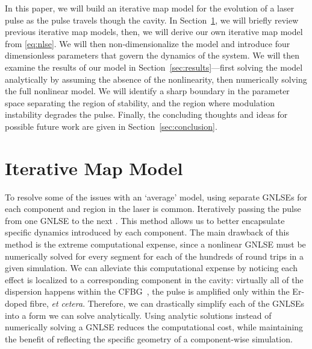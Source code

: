 \documentclass[9pt,twocolumn,twoside]{osajnl}
\begin{document}
In this paper, we will build an iterative map model for the evolution of a laser pulse as the pulse travels though the cavity. In Section~\ref{sec:model}, we will briefly review previous iterative map models, then, we will derive our own iterative map model from \eqref{eq:nlse}. We will then non-dimensionalize the model and introduce four dimensionless parameters that govern the dynamics of the system. We will then examine the results of our model in Section~\ref{sec:results}---first solving the model analytically by assuming the absence of the nonlinearity, then numerically solving the full nonlinear model. We will identify a sharp boundary in the parameter space separating the region of stability, and the region where modulation instability degrades the pulse. Finally, the concluding thoughts and ideas for possible future work are given in Section~\ref{sec:conclusion}.

\section{Iterative Map Model}
\label{sec:model}
To resolve some of the issues with an `average' model, using separate GNLSEs for each component and region in the laser is common. Iteratively passing the pulse from one GNLSE to the next \cite{lapre2019, meng2020, oktem2010, woodward2018}. This method allows us to better encapsulate specific dynamics introduced by each component. The main drawback of this method is the extreme computational expense, since a nonlinear GNLSE must be numerically solved for every segment for each of the hundreds of round trips in a given simulation. We can alleviate this computational expense by noticing each effect is localized to a corresponding component in the cavity: virtually all of the dispersion happens within the CFBG~\cite{agrawal2002}, the pulse is amplified only within the Er-doped fibre, \emph{et cetera}. Therefore, we can drastically simplify each of the GNLSEs into a form we can solve analytically. Using analytic solutions instead of numerically solving a GNLSE reduces the computational cost, while maintaining the benefit of reflecting the specific geometry of a component-wise simulation.
\end{document}
